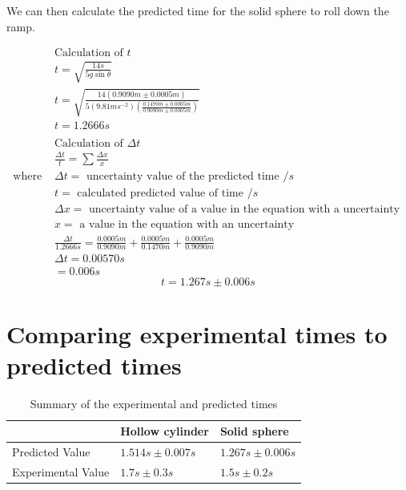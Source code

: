 \documentclass[letterpaper, 12pt]{article}
\begin{document}
We can then calculate the predicted time for the solid sphere to roll
down the ramp.

\begin{align*}
                  & \text{Calculation of } t
    \\
                  & t = \sqrt{\frac{14s}{5g\sin\theta}}
    \\
                  & t = \sqrt{\frac{14(0.9090\unit{m} \pm 0.0005\unit{m})}{5(9.81\unit{ms^{-2}})(\frac{0.1470\unit{m} \pm 0.0005\unit{m}}{0.9090\unit{m} \pm 0.0005\unit{m}})}}
    \\
                  & t = 1.2666\unit{s}
    \\
    \\
                  & \text{Calculation of } \Delta t
    \\
                  & \frac{\Delta t}{t} = \sum \frac{\Delta x}{x}
    \\
    \text{where } & \Delta t = \text{ uncertainty value of the predicted time } /\unit{s}
    \\
                  & t = \text{ calculated predicted value of time } /\unit{s}
    \\
                  & \Delta x = \text{ uncertainty value of a value in the equation with a uncertainty }
    \\
                  & x = \text{ a value in the equation with an uncertainty }
    \\
                  & \frac{\Delta t}{1.2666\unit{s}} = \frac{0.0005\unit{m}}{0.9090\unit{m}} + \frac{0.0005\unit{m}}{0.1470\unit{m}} + \frac{0.0005\unit{m}}{0.9090\unit{m}}
    \\
                  & \Delta t = 0.00570\unit{s}
    \\
                  & = 0.006\unit{s}
\end{align*}
$$
    t = 1.267\unit{s} \pm 0.006\unit{s}
$$

\section{Comparing experimental times to predicted times}

\begin{table}[H]
    \centering
    \caption{Summary of the experimental and predicted times}
    \begin{tabular}{l|l|l}
                           & Hollow cylinder                   & Solid sphere                      \\
        \hline
        Predicted Value    & $1.514\unit{s} \pm 0.007\unit{s}$ & $1.267\unit{s} \pm 0.006\unit{s}$ \\
        \hline
        Experimental Value & $1.7\unit{s} \pm 0.3\unit{s}$     & $1.5\unit{s} \pm 0.2\unit{s}$
    \end{tabular}
    \label{tab:summary}
\end{table}
\end{document}
